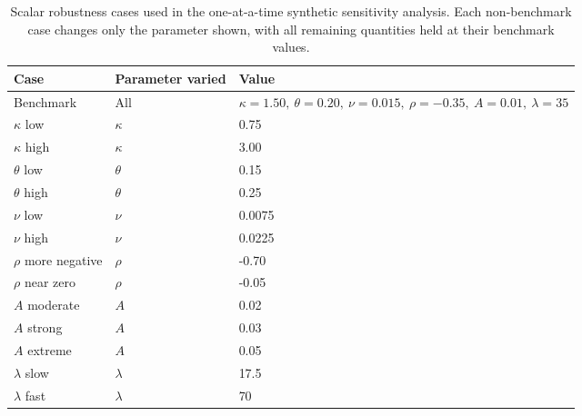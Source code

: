 \begin{table}[htbp]
    \centering
    \small
    \begin{tabular}{lll}
        \toprule
        Case & Parameter varied & Value \\
        \midrule
        Benchmark & All & $\kappa=1.50,\ \theta=0.20,\ \nu=0.015,\ \rho=-0.35,\ A=0.01,\ \lambda=35$ \\
        $\kappa$ low & $\kappa$ & 0.75 \\
        $\kappa$ high & $\kappa$ & 3.00 \\
        $\theta$ low & $\theta$ & 0.15 \\
        $\theta$ high & $\theta$ & 0.25 \\
        $\nu$ low & $\nu$ & 0.0075 \\
        $\nu$ high & $\nu$ & 0.0225 \\
        $\rho$ more negative & $\rho$ & -0.70 \\
        $\rho$ near zero & $\rho$ & -0.05 \\
        $A$ moderate & $A$ & 0.02 \\
        $A$ strong & $A$ & 0.03 \\
        $A$ extreme & $A$ & 0.05 \\
        $\lambda$ slow & $\lambda$ & 17.5 \\
        $\lambda$ fast & $\lambda$ & 70 \\
        \bottomrule
    \end{tabular}
    \caption{Scalar robustness cases used in the one-at-a-time synthetic sensitivity analysis. Each non-benchmark case changes only the parameter shown, with all remaining quantities held at their benchmark values.}
    \label{tab:scalar_robustness_cases}
\end{table}